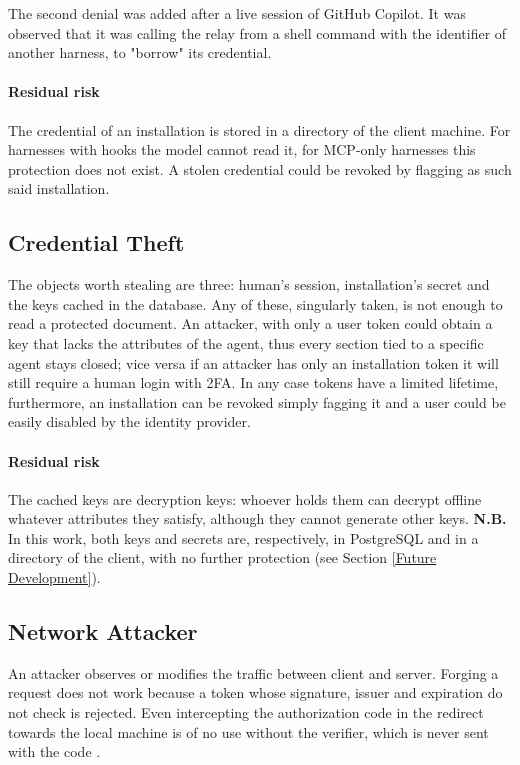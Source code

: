The second denial was added after a live session of GitHub Copilot. It was observed that it was calling the relay from a shell command with the identifier of another harness, to "borrow" its credential.
\paragraph{Residual risk} The credential of an installation is stored in a directory of the client machine. For harnesses with hooks the model cannot read it, for MCP-only harnesses this protection does not exist. A stolen credential could be revoked by flagging as such said installation.

\subsection{Credential Theft}
The objects worth stealing are three: human's session, installation's secret and the keys cached in the database.
Any of these, singularly taken, is not enough to read a protected document.
An attacker, with only a user token could obtain a key that lacks the attributes of the agent, thus every section tied to a specific agent stays closed; vice versa if an attacker has only an installation token it will still require a human login with 2FA.
In any case tokens have a limited lifetime, furthermore, an installation can be revoked simply fagging it and a user could be easily disabled by the identity provider.

\paragraph{Residual risk} The cached keys are decryption keys: whoever holds them can decrypt offline whatever attributes they satisfy, although they cannot generate other keys.
\textbf{N.B.} In this work, both keys and secrets are, respectively, in PostgreSQL and in a directory of the client, with no further protection (see Section \ref{Future Development}).

\subsection{Network Attacker}
An attacker observes or modifies the traffic between client and server.
Forging a request does not work because a token whose signature, issuer and expiration do not check is rejected.
Even intercepting the authorization code in the redirect towards the local machine is of no use without the verifier, which is never sent with the code \cite{rfc7636}.


